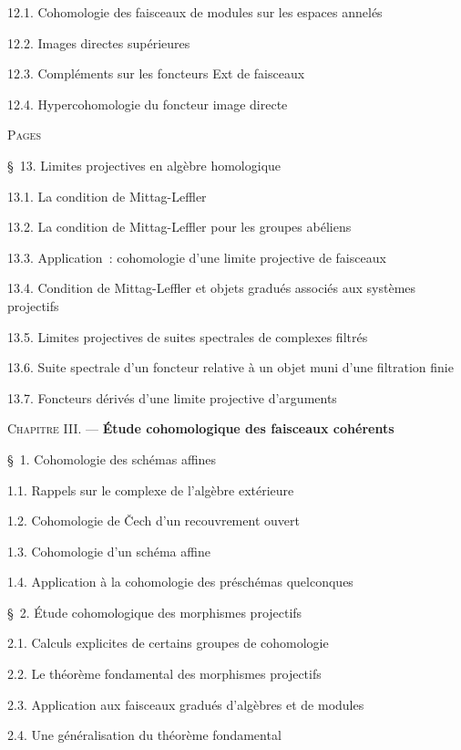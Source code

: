 \begin{flushleft}
12.1. Cohomologie des faisceaux de modules sur les espaces annelés 

12.2. Images directes supérieures 

12.3. Compléments sur les foncteurs Ext de faisceaux 

12.4. Hypercohomologie du foncteur image directe 


\hfill\textsc{Pages}

\S~13. Limites projectives en algèbre homologique 

13.1. La condition de Mittag-Leffler 

13.2. La condition de Mittag-Leffler pour les groupes abéliens 

13.3. Application~: cohomologie d'une limite projective de faisceaux 

13.4. Condition de Mittag-Leffler et objets gradués associés aux systèmes
projectifs 

13.5. Limites projectives de suites spectrales de complexes filtrés 

13.6. Suite spectrale d'un foncteur relative à un objet muni d'une filtration
finie 

13.7. Foncteurs dérivés d'une limite projective d'arguments 

\medskip
\textsc{Chapitre III.} --- \textbf{Étude cohomologique des faisceaux
cohérents} 

\medskip
\S~1. Cohomologie des schémas affines 

1.1. Rappels sur le complexe de l'algèbre extérieure 

1.2. Cohomologie de Čech d'un recouvrement ouvert 

1.3. Cohomologie d'un schéma affine 

1.4. Application à la cohomologie des préschémas quelconques 

\medskip
\S~2. Étude cohomologique des morphismes projectifs 

2.1. Calculs explicites de certains groupes de cohomologie 

2.2. Le théorème fondamental des morphismes projectifs 

2.3. Application aux faisceaux gradués d'algèbres et de modules 

2.4. Une généralisation du théorème fondamental 


\end{flushleft}

